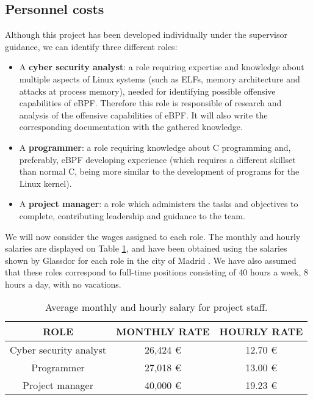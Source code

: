 \subsection{Personnel costs}
Although this project has been developed individually under the supervisor guidance, we can identify three different roles:
\begin{itemize}
\item A \textbf{cyber security analyst}: a role requiring expertise and knowledge about multiple aspects of Linux systems (such as ELFs, memory architecture and attacks at process memory), needed for identifying possible offensive capabilities of eBPF. Therefore this role is responsible of research and analysis of the offensive capabilities of eBPF. It will also write the corresponding documentation with the gathered knowledge.
\item A \textbf{programmer}: a role requiring knowledge about C programming and, preferably, eBPF developing experience (which requires a different skillset than normal C, being more similar to the development of programs for the Linux kernel).
\item A \textbf{project manager}: a role which administers the tasks and objectives to complete, contributing leadership and guidance to the team.
\end{itemize}

We will now consider the wages assigned to each role. The monthly and hourly salaries are displayed on Table \ref{table:salary_personnel}, and have been obtained using the salaries shown by Glassdor for each role in the city of Madrid \cite{glass_analyst} \cite{glass_manager} \cite{glass_programmer}. We have also assumed that these roles correspond to full-time positions consisting of 40 hours a week, 8 hours a day, with no vacations.

\begin{table}[htbp]
\begin{tabular}{|c|c|c|}
\hline
\textbf{ROLE} & \textbf{MONTHLY RATE} & \textbf{HOURLY RATE}\\
\hline
\hline
Cyber security analyst & 26,424 € & 12.70 € \\
\hline
Programmer & 27,018 € & 13.00 € \\
\hline
Project manager & 40,000 € & 19.23 € \\ 
\hline
\end{tabular}
\caption{Average monthly and hourly salary for project staff.}
\label{table:salary_personnel}
\end{table}

